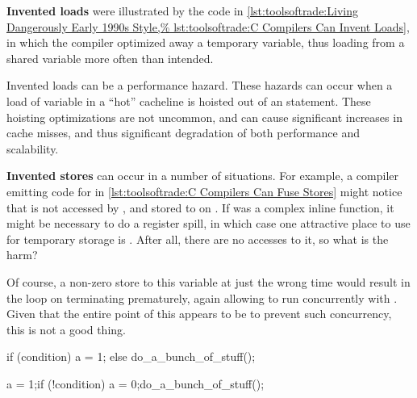 {\bf Invented loads} were illustrated by the code in
\cref{lst:toolsoftrade:Living Dangerously Early 1990s Style,%
lst:toolsoftrade:C Compilers Can Invent Loads},
in which the compiler optimized away a temporary variable,
thus loading from a shared variable more often than intended.

Invented loads can be a performance hazard.
These hazards can occur when a load of variable in a ``hot''
cacheline is hoisted out of an  statement.
These hoisting optimizations are not uncommon, and can cause significant
increases in cache misses, and thus significant degradation of
both performance and scalability.

\begin{fcvref}
{\bf Invented stores} can occur in a number of situations.
For example, a compiler emitting code for  in
\cref{lst:toolsoftrade:C Compilers Can Fuse Stores}
might notice that  is not accessed by
, and stored to on .
If  was a complex inline function, it might be
necessary to do a register spill, in which case one attractive
place to use for temporary storage is .
After all, there are no accesses to it, so what is the harm?

Of course, a non-zero store to this variable at just the wrong time
would result in the  loop on
 terminating
prematurely, again allowing  to run
concurrently with .
Given that the entire point of this  appears to be to
prevent such concurrency, this is not a good thing.
\end{fcvref}

\begin{listing}
\begin{fcvlabel}
\begin{VerbatimL}[commandchars=\\\{\}]
if (condition)
	a = 1;
else
	do_a_bunch_of_stuff();
\end{VerbatimL}
\end{fcvlabel}
\caption{Inviting an Invented Store}
\label{lst:toolsoftrade:Inviting an Invented Store}
\end{listing}

\begin{listing}
\begin{fcvlabel}
\begin{VerbatimL}[commandchars=\\\[\]]
a = 1;
if (!condition) {
	a = 0;
	do_a_bunch_of_stuff();
}
\end{VerbatimL}
\end{fcvlabel}
\caption{Compiler Invents an Invited Store}
\label{lst:toolsoftrade:Compiler Invents an Invited Store}
\end{listing}

